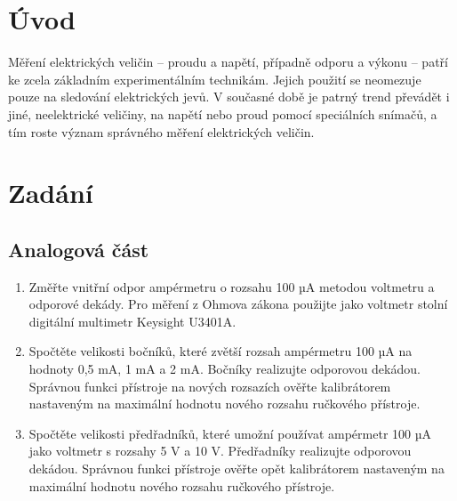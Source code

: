 \documentclass[czech,11pt,a4paper]{article}
\begin{document}
	\section{Úvod}
	Měření elektrických veličin – proudu a napětí, případně odporu a výkonu – patří ke zcela základním
	experimentálním technikám. Jejich použití se neomezuje pouze na sledování elektrických jevů.
	V současné době je patrný trend převádět i jiné, neelektrické veličiny, na napětí nebo proud
	pomocí speciálních snímačů, a tím roste význam správného měření elektrických veličin.
	
	
	
	\section{Zadání}
	\subsection{Analogová část}
		\begin{enumerate}
			\item Změřte vnitřní odpor ampérmetru o rozsahu 100 µA metodou voltmetru a odporové dekády. Pro
			měření z Ohmova zákona použijte jako voltmetr stolní digitální multimetr Keysight U3401A.
			\item Spočtěte velikosti bočníků, které zvětší rozsah ampérmetru 100 µA na hodnoty 0,5 mA,
			1 mA a 2 mA. Bočníky realizujte odporovou dekádou. Správnou funkci přístroje na nových
			rozsazích ověřte kalibrátorem nastaveným na maximální hodnotu nového rozsahu ručkového
			přístroje.
			\item Spočtěte velikosti předřadníků, které umožní používat ampérmetr 100 µA jako voltmetr
			s rozsahy 5 V a 10 V. Předřadníky realizujte odporovou dekádou. Správnou funkci přístroje
			ověřte opět kalibrátorem nastaveným na maximální hodnotu nového rozsahu ručkového přístroje.
		\end{enumerate}
	
\end{document}
